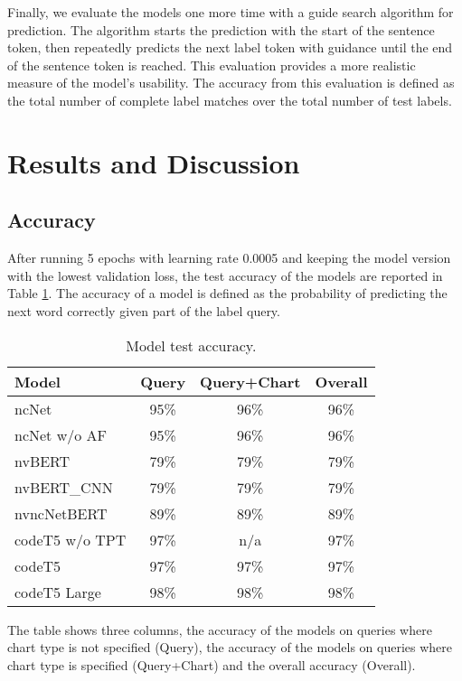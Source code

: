 \documentclass[
	a4paper, %
	10pt, %
	unnumberedsections, %
	twoside, %
]{t0003}
\begin{document}
Finally, we evaluate the models one more time with a guide search algorithm for prediction. The algorithm starts the prediction with the start of the sentence token, then repeatedly predicts the next label token with guidance until the end of the sentence token is reached. This evaluation provides a more realistic measure of the model's usability. The accuracy from this evaluation is defined as the total number of complete label matches over the total number of test labels.

\section{Results and Discussion}

\subsection{Accuracy}

After running 5 epochs with learning rate 0.0005 and keeping the model version with the lowest validation loss, the test accuracy of the models are reported in Table \ref{tab:accuracy}. The accuracy of a model is defined as the probability of predicting the next word correctly given part of the label query.

\begin{table} %
	\caption{Model test accuracy.}
	\centering
	\begin{tabular}{lccc}
		\toprule
		Model & Query & Query+Chart & Overall \\
		\midrule
		ncNet & 95\% & 96\% & 96\% \\
		ncNet w/o AF & 95\% & 96\% & 96\% \\
		\hline
		nvBERT & 79\% & 79\% & 79\% \\
		nvBERT\_CNN & 79\% & 79\% & 79\% \\
		nvncNetBERT & 89\% & 89\% & 89\% \\
		\hline
		codeT5 w/o TPT & 97\% & n/a & 97\% \\
		codeT5 & 97\% & 97\% & 97\% \\
		codeT5 Large & 98\% & 98\% & 98\% \\
		\bottomrule
	\end{tabular}
	\label{tab:accuracy}
\end{table}

The table shows three columns, the accuracy of the models on queries where chart type is not specified (Query), the accuracy of the models on queries where chart type is specified (Query+Chart) and the overall accuracy (Overall).
\end{document}
